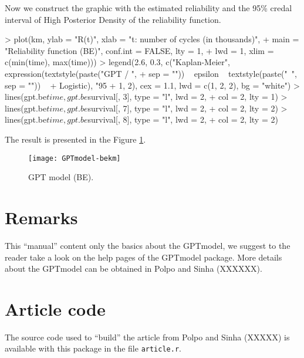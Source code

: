 \documentclass[nogin,letterpaper,12pt]{article}
\begin{document}
Now we construct the graphic with the estimated reliability and the 95\% credal interval of High Posterior Density of the reliability function.

\begin{Schunk}
\begin{Sinput}
> plot(km, ylab = "R(t)", xlab = "t: number of cycles (in thousands)", 
+     main = "Reliability function (BE)", conf.int = FALSE, lty = 1, 
+     lwd = 1, xlim = c(min(time), max(time)))
> legend(2.6, 0.3, c("Kaplan-Meier", expression(textstyle(paste("GPT / ", 
+     sep = "")) ~ epsilon ~ textstyle(paste("~", sep = "")) ~ 
+     Logistic), "95% HPD Interval"), col = c(1, 2, 2), lty = c(1, 
+     1, 2), cex = 1.1, lwd = c(1, 2, 2), bg = "white")
> lines(gpt.be$time, gpt.be$survival[, 3], type = "l", lwd = 2, 
+     col = 2, lty = 1)
> lines(gpt.be$time, gpt.be$survival[, 7], type = "l", lwd = 2, 
+     col = 2, lty = 2)
> lines(gpt.be$time, gpt.be$survival[, 8], type = "l", lwd = 2, 
+     col = 2, lty = 2)
\end{Sinput}
\end{Schunk}

The result is presented in the Figure \ref{figgptbe}.

\begin{figure}[ht!]
\centering
\captionsetup{justification=centering}
\texttt{[image: GPTmodel-bekm]}
\caption{GPT model (BE).}
\label{figgptbe}
\end{figure}

\section{Remarks}

This ``manual'' content only the basics about the GPTmodel, we suggest to the reader take a look on the help pages of the GPTmodel package. More details about the GPTmodel can be obtained in Polpo and Sinha (XXXXXX).

\newpage
\appendix
\section{Article code}

The source code used to ``build'' the article from Polpo and Sinha (XXXXX) is available with this package in the file \verb=article.r=.
\end{document}

